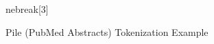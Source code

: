 \documentclass[11pt]{article}
\begin{document}
\begin{figure}[p]
\begin{minipage}{\textwidth}
\begin{tokenized}
{nebreak[3]\linebreak[3]\linebreak[3]\linebreak[3]\linebreak[3]\linebreak[3]\linebreak[3]\linebreak[3]\tokenbox{~(}\linebreak[3]\linebreak[3]\linebreak[3]\linebreak[3]\linebreak[3]\linebreak[3]
}
\end{tokenized}
\end{minipage}
    \caption{Pile (PubMed Abstracts) Tokenization Example}
    \label{fig:tok_example_15}
\end{figure}
\end{document}
